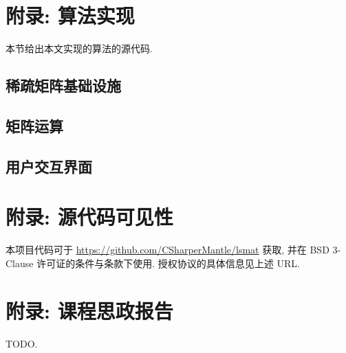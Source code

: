 \appendix

\section{附录: 算法实现}

本节给出本文实现的算法的源代码.

\subsection{稀疏矩阵基础设施}





\subsection{矩阵运算}





\subsection{用户交互界面}



\section{附录: 源代码可见性}
\label{appendix_source_code}

本项目代码可于 \url{https://github.com/CSharperMantle/lsmat} 获取, 并在 BSD 3-Clause 许可证的条件与条款下使用. 授权协议的具体信息见上述 URL.

\section{附录: 课程思政报告}

TODO.
